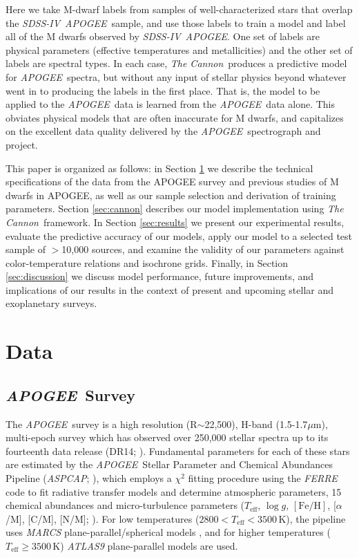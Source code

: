 \documentclass[modern]{aastex62}
\newcommand{\apogee}{\textsl{APOGEE}}
\newcommand{\thecannon}{\textsl{The Cannon}}
\newcommand{\aspcap}{\textsl{ASPCAP}}
\newcommand{\sdssiv}{\textsl{SDSS-IV}}
\newcommand{\teff}{T_{\mathrm{eff}}}
\newcommand{\logg}{\log g}
\newcommand{\feh}{[{\mathrm{Fe}/\mathrm{H}}]}
\begin{document}
Here we take M-dwarf labels from samples of well-characterized stars that overlap the
\sdssiv\ \apogee\ sample, and use those labels to train a model and label all of the M dwarfs observed by
\sdssiv\ \apogee. One set of labels are physical parameters (effective temperatures and metallicities)
and the other set of labels are spectral types. In each case, \thecannon\ produces a predictive model for \apogee\ spectra, but without
any input of stellar physics beyond whatever went in to producing the labels in the first
place. That is, the model to be applied to the \apogee\ data is learned from the \apogee\ data alone.
This obviates physical models that are often inaccurate for M dwarfs, and capitalizes on the excellent data quality
delivered by the \apogee\ spectrograph and project.

This paper is organized as follows: in Section \ref{sec:data} we describe the technical specifications of the data from the APOGEE survey and previous studies of M dwarfs in APOGEE, as well as our sample selection and derivation of training parameters. 
Section \ref{sec:cannon} describes our model implementation using \thecannon\ framework.
In Section \ref{sec:results} we present our experimental results, evaluate the predictive accuracy of our models, apply our model to a selected test sample of $>$10,000 sources, and examine the validity of our parameters against color-temperature relations and isochrone grids.
Finally, in Section \ref{sec:discussion} we discuss model performance, future improvements, and implications of our results in the context of present and upcoming stellar and exoplanetary surveys.


\section{Data} \label{sec:data}

\subsection{\apogee\ Survey}

The \apogee\ survey is a high resolution (R$\sim$22,500), H-band (1.5-1.7$\mu$m), multi-epoch survey which has observed over 250,000 stellar spectra up to its fourteenth data release (DR14; \citealt{Abolfathi:2017}). Fundamental parameters for each of these stars are estimated by the \apogee\ Stellar Parameter and Chemical Abundances Pipeline (\aspcap; \citealt{Perez:2016}), which employs a $\chi^2$ fitting procedure using the \textsl{FERRE} code to fit radiative transfer models and determine atmospheric parameters, 15 chemical abundances and micro-turbulence parameters ($\teff$, $\logg$, $\feh$, [$\alpha$/M], [C/M], [N/M]; \citealt{Meszaros:2012}). For low temperatures ($2800<\teff<3500$\,K), the pipeline uses \textsl{MARCS} plane-parallel/spherical models \citep{Gustafsson:2008}, and for higher temperatures ($\teff\geq3500$\,K) \textsl{ATLAS9} \citep{Castelli:2004} plane-parallel models are used.
\end{document}
